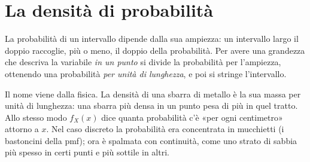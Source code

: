 \section{La densità di probabilità}

La probabilità di un intervallo dipende dalla sua ampiezza: un intervallo largo il doppio raccoglie, più o meno, il
doppio della probabilità. Per avere una grandezza che descriva la variabile \emph{in un punto} si divide la
probabilità per l'ampiezza, ottenendo una probabilità \emph{per unità di lunghezza}, e poi si stringe l'intervallo.


Il nome viene dalla fisica. La densità di una sbarra di metallo è la sua massa per unità di lunghezza: una sbarra
più densa in un punto pesa di più in quel tratto. Allo stesso modo $f_X(x)$ dice quanta probabilità c'è «per ogni
centimetro» attorno a $x$. Nel caso discreto la probabilità era concentrata in mucchietti (i bastoncini della pmf);
ora è spalmata con continuità, come uno strato di sabbia più spesso in certi punti e più sottile in altri.

